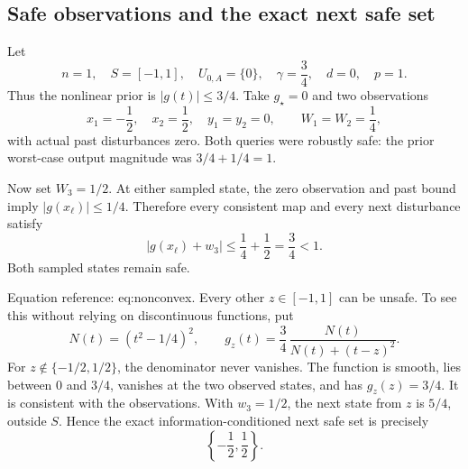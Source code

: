 \documentclass[10pt]{article}
\begin{document}
\subsection*{Safe observations and the exact next safe set}
Let \[n=1,\quad S=[-1,1],\quad U_{0,A}=\{0\},\quad
 \gamma=\frac34,\quad d=0,\quad p=1.\] Thus the nonlinear prior is \(|g(t)|\le3/4\). Take \(g_\star=0\) and two observations \[x_1=-\frac12,\quad x_2=\frac12,\quad
 y_1=y_2=0,\qquad W_1=W_2=\frac14,\] with actual past disturbances zero. Both queries were robustly safe: the prior worst-case output magnitude was \(3/4+1/4=1\).\par
Now set \(W_3=1/2\). At either sampled state, the zero observation and past bound imply \(|g(x_\ell)|\le1/4\). Therefore every consistent map and every next disturbance satisfy \[|g(x_\ell)+w_3|\le\frac14+\frac12=\frac34<1.\] Both sampled states remain safe.\par
Equation reference: eq:nonconvex. Every other \(z\in[-1,1]\) can be unsafe. To see this without relying on discontinuous functions, put \[N(t)=(t^2-1/4)^2,\qquad
 g_z(t)=\frac34\,\frac{N(t)}{N(t)+(t-z)^2}.\] For \(z\notin\{-1/2,1/2\}\), the denominator never vanishes. The function is smooth, lies between \(0\) and \(3/4\), vanishes at the two observed states, and has \(g_z(z)=3/4\). It is consistent with the observations. With \(w_3=1/2\), the next state from \(z\) is \(5/4\), outside \(S\). Hence the exact information-conditioned next safe set is precisely \[\left\{-\frac12,\frac12\right\}.
 \]\par
\end{document}

